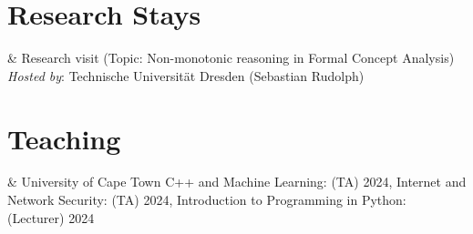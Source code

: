 \documentclass[10pt,a4paper]{article}
\begin{document}

\section{Research Stays}

\begin{EntriesTableYear}
	  &
	Research visit (Topic: Non-monotonic reasoning in Formal Concept Analysis)\newline
	\emph{Hosted by}: Technische Universität Dresden (Sebastian Rudolph)
\end{EntriesTableYear}





\section{Teaching}

\begin{EntriesTableYear}
	 & University of Cape Town\newline
	C++ and Machine Learning: (TA) 2024, \newline
	Internet and Network Security: (TA) 2024, \newline
	Introduction to Programming in Python: (Lecturer) 2024
\end{EntriesTableYear}
\end{document}
